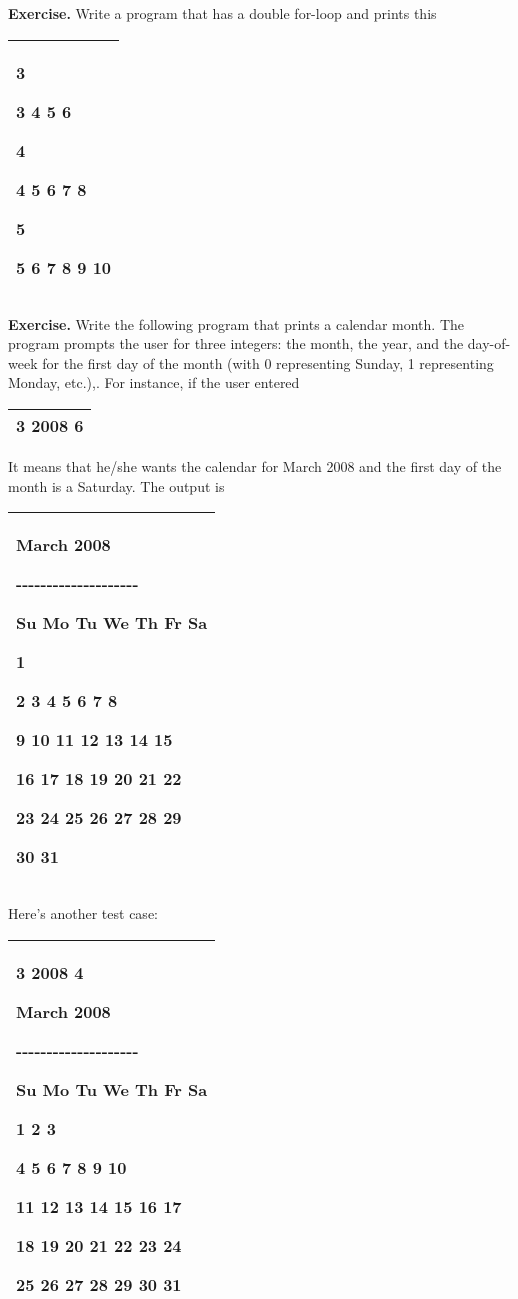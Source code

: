 \documentclass[
]{article}
\begin{document}
\textbf{Exercise.} Write a program that has a double for-loop and prints
this

\begin{longtable}[]{@{}l@{}}
\toprule
\endhead
\begin{minipage}[t]{0.97\columnwidth}\raggedright
3

3 4 5 6

4

4 5 6 7 8

5

5 6 7 8 9 10\strut
\end{minipage}\tabularnewline
\bottomrule
\end{longtable}

\textbf{Exercise. }Write the following program that prints a calendar
month. The program prompts the user for three integers: the month, the
year, and the day-of-week for the first day of the month (with 0
representing Sunday, 1 representing Monday, etc.),. For instance, if the
user entered

\begin{longtable}[]{@{}l@{}}
\toprule
\endhead
3 2008 6\tabularnewline
\bottomrule
\end{longtable}

It means that he/she wants the calendar for March 2008 and the first day
of the month is a Saturday. The output is

\begin{longtable}[]{@{}l@{}}
\toprule
\endhead
\begin{minipage}[t]{0.97\columnwidth}\raggedright
March 2008

-\/-\/-\/-\/-\/-\/-\/-\/-\/-\/-\/-\/-\/-\/-\/-\/-\/-\/-\/-

Su Mo Tu We Th Fr Sa

1

2 3 4 5 6 7 8

9 10 11 12 13 14 15

16 17 18 19 20 21 22

23 24 25 26 27 28 29

30 31\strut
\end{minipage}\tabularnewline
\bottomrule
\end{longtable}

Here's another test case:

\begin{longtable}[]{@{}l@{}}
\toprule
\endhead
\begin{minipage}[t]{0.97\columnwidth}\raggedright
3 2008 4

March 2008

-\/-\/-\/-\/-\/-\/-\/-\/-\/-\/-\/-\/-\/-\/-\/-\/-\/-\/-\/-

Su Mo Tu We Th Fr Sa

1 2 3

4 5 6 7 8 9 10

11 12 13 14 15 16 17

18 19 20 21 22 23 24

25 26 27 28 29 30 31\strut
\end{minipage}\tabularnewline
\bottomrule
\end{longtable}
\end{document}
